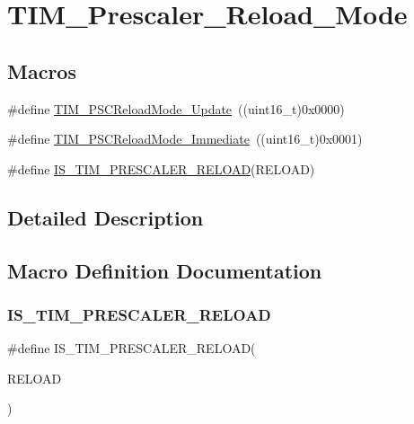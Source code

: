 \hypertarget{group___t_i_m___prescaler___reload___mode}{}\section{T\+I\+M\+\_\+\+Prescaler\+\_\+\+Reload\+\_\+\+Mode}
\label{group___t_i_m___prescaler___reload___mode}
\subsection*{Macros}
\begin{DoxyCompactItemize}
\item 
\#define \mbox{\hyperlink{group___t_i_m___prescaler___reload___mode_gad76dd05a3ae4e44e040e0e083bd460bf}{T\+I\+M\+\_\+\+P\+S\+C\+Reload\+Mode\+\_\+\+Update}}~((uint16\+\_\+t)0x0000)
\item 
\#define \mbox{\hyperlink{group___t_i_m___prescaler___reload___mode_ga9ba55481ccdcb64268b7b9f2095bfc17}{T\+I\+M\+\_\+\+P\+S\+C\+Reload\+Mode\+\_\+\+Immediate}}~((uint16\+\_\+t)0x0001)
\item 
\#define \mbox{\hyperlink{group___t_i_m___prescaler___reload___mode_ga156317fc6b2c1f6f2e1da9dfa555ecf4}{I\+S\+\_\+\+T\+I\+M\+\_\+\+P\+R\+E\+S\+C\+A\+L\+E\+R\+\_\+\+R\+E\+L\+O\+AD}}(R\+E\+L\+O\+AD)
\end{DoxyCompactItemize}


\subsection{Detailed Description}


\subsection{Macro Definition Documentation}
\mbox{\label{group___t_i_m___prescaler___reload___mode_ga156317fc6b2c1f6f2e1da9dfa555ecf4}} 
\subsubsection{\texorpdfstring{IS\_TIM\_PRESCALER\_RELOAD}{IS\_TIM\_PRESCALER\_RELOAD}}
{\footnotesize\ttfamily \#define I\+S\+\_\+\+T\+I\+M\+\_\+\+P\+R\+E\+S\+C\+A\+L\+E\+R\+\_\+\+R\+E\+L\+O\+AD(\begin{DoxyParamCaption}\item[{}]{R\+E\+L\+O\+AD }\end{DoxyParamCaption})}

